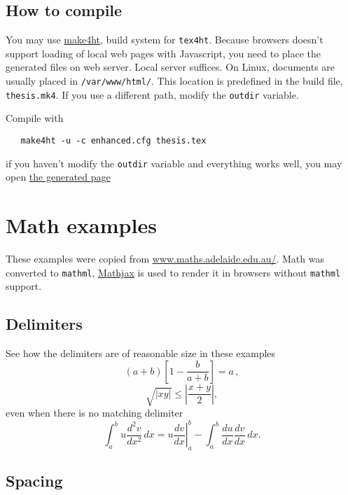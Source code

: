 \documentclass[11pt,a4paper,oldfontcommands]{memoir}
\begin{document}
\section{How to compile}\label{how-to-compile}

You may use \href{https://github.com/michal-h21/make4ht}{make4ht}, build
system for \texttt{tex4ht}. Because browsers doesn't support loading of
local web pages with Javascript, you need to place the generated files
on web server. Local server suffices. On Linux, documents are usually
placed in \texttt{/var/www/html/}. This location is predefined in the
build file, \texttt{thesis.mk4}. If you use a different path, modify the
\texttt{outdir} variable.

Compile with

\begin{verbatim}
   make4ht -u -c enhanced.cfg thesis.tex
\end{verbatim}

 if you haven't modify the \texttt{outdir} variable and everything works
 well, you may open \href{http://localhost/reyman/thesis.html}{the
   generated page}


\chapter{Math examples}

These examples were copied from 
\href{http://www.maths.adelaide.edu.au/anthony.roberts/LaTeX/Src/maths.tex}{www.maths.adelaide.edu.au/}. 
Math was converted to \texttt{mathml}, \href{https://www.mathjax.org/}{Mathjax}
is used to render it in browsers without \texttt{mathml} support.

\section{Delimiters}

See how the delimiters are of reasonable size in these examples
\[
  \left(a+b\right)\left[1-\frac{b}{a+b}\right]=a\,,
\]
\[
  \sqrt{|xy|}\leq\left|\frac{x+y}{2}\right|,
\]
even when there is no matching delimiter
\[
  \int_a^bu\frac{d^2v}{dx^2}\,dx
  =\left.u\frac{dv}{dx}\right|_a^b
  -\int_a^b\frac{du}{dx}\frac{dv}{dx}\,dx.
\]






\section{Spacing}
\end{document}
